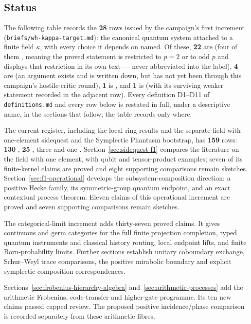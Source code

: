 \subsection*{Status}
\label{sec:overview-status}

The following table records the \textbf{28} rows issued by the campaign's
first increment
(\texttt{briefs/wh-kappa-target.md}): the canonical quantum system attached
to a finite field $\kappa$, with every choice it depends on named. Of these,
\textbf{22} are \statusProved{} (four of them \statusProvedConditional{},
meaning the proved statement is restricted to $p=2$ or to odd $p$ and
displays that restriction in its own text — never abbreviated into the
label), \textbf{4} are \statusSketch{} (an argument exists and is written
down, but has not yet been through this campaign's hostile-critic round),
\textbf{1} is \statusConjecture{}, and \textbf{1} is \statusRefuted{} (with
its surviving weaker statement recorded in the adjacent row). Every
definition D1--D11 of \texttt{definitions.md} and every row below is
restated in full, under a descriptive name, in the sections that follow;
the table records only where.

The current register, including the local-ring results and the separate
field-with-one-element sidequest and the Symplectic Phantasm bootstrap, has
\textbf{159} rows: \textbf{130}
\statusProved{}, \textbf{25} \statusSketch{}, three \statusConjecture{} and
one \statusRefuted{}. Section~\ref{sec:sidequest-f1} compares the
literature on the field with one element, with qubit and tensor-product
examples; seven of its finite-kernel claims are proved and eight supporting
comparisons remain sketches. Section~\ref{sec:f1-operational} develops the
subsystem-composition direction: a positive Hecke family, its symmetric-group
quantum endpoint, and an exact contextual process theorem. Eleven claims
of this operational increment are proved and seven supporting comparisons
remain sketches.

The categorical-limit increment adds thirty-seven proved claims. It gives
continuous and germ categories for the full finite projection completion,
typed quantum instruments and classical history routing, local endpoint
lifts, and finite Born-probability limits. Further sections establish
unitary coboundary exchange, Schur--Weyl trace comparisons, the positive
mirabolic boundary and explicit symplectic composition correspondences.

Sections~\ref{sec:frobenius-hierarchy-algebra} and~\ref{sec:arithmetic-processes}
add the arithmetic Frobenius, code-transfer and higher-gate programme. Its
ten new claims passed capped review. The proposed positive
incidence/phase comparison is recorded separately from these arithmetic fibres.

